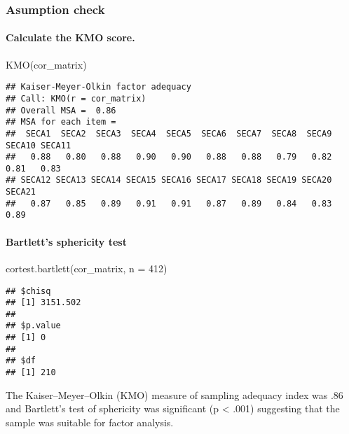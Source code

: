 \documentclass[
]{article}
\newenvironment{Shaded}{\begin{snugshade}}{\end{snugshade}}
\newcommand{\AttributeTok}[1]{\textcolor[rgb]{0.77,0.63,0.00}{#1}}
\newcommand{\DecValTok}[1]{\textcolor[rgb]{0.00,0.00,0.81}{#1}}
\newcommand{\FunctionTok}[1]{\textcolor[rgb]{0.00,0.00,0.00}{#1}}
\newcommand{\NormalTok}[1]{#1}
\begin{document}
\hypertarget{asumption-check}{%
\subsubsection{Asumption check}\label{asumption-check}}

\hypertarget{calculate-the-kmo-score.}{%
\paragraph{Calculate the KMO score.}\label{calculate-the-kmo-score.}}

\begin{Shaded}
\begin{Highlighting}[]
\FunctionTok{KMO}\NormalTok{(cor\_matrix)}
\end{Highlighting}
\end{Shaded}

\begin{verbatim}
## Kaiser-Meyer-Olkin factor adequacy
## Call: KMO(r = cor_matrix)
## Overall MSA =  0.86
## MSA for each item = 
##  SECA1  SECA2  SECA3  SECA4  SECA5  SECA6  SECA7  SECA8  SECA9 SECA10 SECA11 
##   0.88   0.80   0.88   0.90   0.90   0.88   0.88   0.79   0.82   0.81   0.83 
## SECA12 SECA13 SECA14 SECA15 SECA16 SECA17 SECA18 SECA19 SECA20 SECA21 
##   0.87   0.85   0.89   0.91   0.91   0.87   0.89   0.84   0.83   0.89
\end{verbatim}

\hypertarget{bartletts-sphericity-test}{%
\paragraph{Bartlett's sphericity test}\label{bartletts-sphericity-test}}

\begin{Shaded}
\begin{Highlighting}[]
\FunctionTok{cortest.bartlett}\NormalTok{(cor\_matrix, }\AttributeTok{n =} \DecValTok{412}\NormalTok{)}
\end{Highlighting}
\end{Shaded}

\begin{verbatim}
## $chisq
## [1] 3151.502
## 
## $p.value
## [1] 0
## 
## $df
## [1] 210
\end{verbatim}

The Kaiser--Meyer--Olkin (KMO) measure of sampling adequacy index was
.86 and Bartlett's test of sphericity was significant (p \textless{}
.001) suggesting that the sample was suitable for factor analysis.
\end{document}
